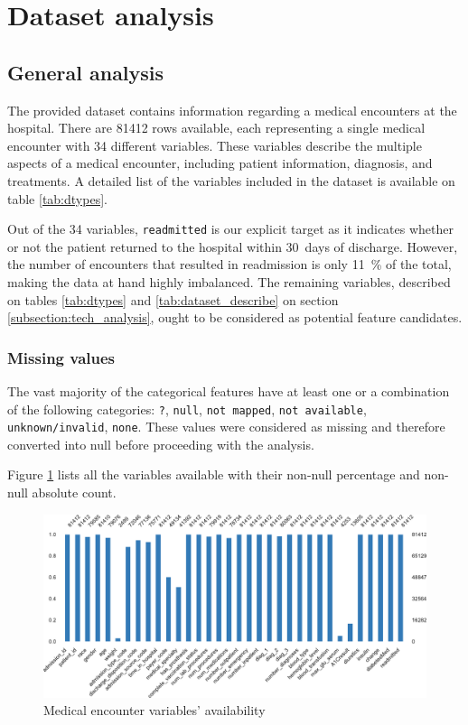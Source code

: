 \documentclass[a4paper,11pt]{article}
\newcommand{\readmitted}{\texttt{readmitted}\xspace}
\begin{document}
\newpage
\section{Dataset analysis}
\subsection{General analysis}
\label{sec:dataset_general_analysis}
The provided dataset contains information regarding a medical encounters at the hospital. There are \SI{81412}{} rows available, each representing a single medical encounter with \SI{34}{} different variables. 
These variables describe the multiple aspects of a medical encounter, including patient information, diagnosis, and treatments.
A detailed list of the variables included in the dataset is available on table \ref{tab:dtypes}.

Out of the \SI{34}{} variables, \readmitted is our explicit target as it indicates whether or not the patient returned to the hospital within \SI{30}{days} of discharge. However, the number of encounters that resulted in readmission is only \SI{11}{\percent} of the total, making the data at hand highly imbalanced. The remaining variables, described on tables \ref{tab:dtypes} and \ref{tab:dataset_describe} on section \ref{subsection:tech_analysis}, ought to be considered as potential feature candidates.

\subsubsection{Missing values}

The vast majority of the categorical features have at least one or a combination of the following categories: \texttt{?}, \texttt{null}, \texttt{not mapped}, \texttt{not available}, \texttt{unknown/invalid}, \texttt{none}. These values were considered as missing and therefore converted into null before proceeding with the analysis.

Figure \ref{fig:missing_values} lists all the variables available with their non-null percentage and non-null absolute count.

\begin{figure}[htb]
	\centering
	\includegraphics[width=1\textwidth]{images/missing_values.pdf}
	\caption{Medical encounter variables' availability}
	\label{fig:missing_values}
\end{figure}
\end{document}
